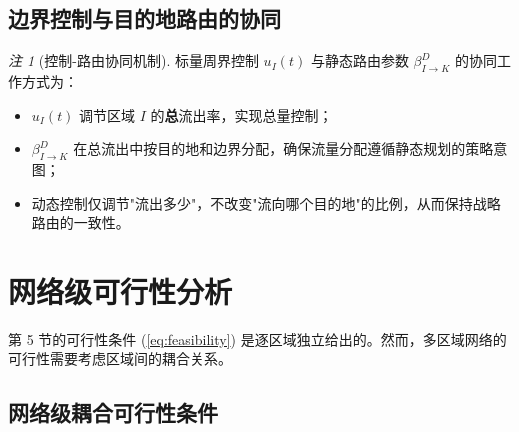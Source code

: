 \documentclass[a4paper,12pt]{article}
\theoremstyle{plain}
\theoremstyle{definition}
\theoremstyle{remark}
\newtheorem{remark}[theorem]{注}
\begin{document}
\subsection{边界控制与目的地路由的协同}

\begin{remark}[控制-路由协同机制]\label{rem:control_routing}
标量周界控制 $u_I(t)$ 与静态路由参数 $\beta_{I \to K}^D$ 的协同工作方式为：
\begin{itemize}
    \item $u_I(t)$ 调节区域 $I$ 的\textbf{总}流出率，实现总量控制；
    \item $\beta_{I \to K}^D$ 在总流出中按目的地和边界分配，确保流量分配遵循静态规划的策略意图；
    \item 动态控制仅调节"流出多少"，不改变"流向哪个目的地"的比例，从而保持战略路由的一致性。
\end{itemize}
\end{remark}

\section{网络级可行性分析}

第 5 节的可行性条件 (\ref{eq:feasibility}) 是逐区域独立给出的。然而，多区域网络的可行性需要考虑区域间的耦合关系。

\subsection{网络级耦合可行性条件}
\end{document}
